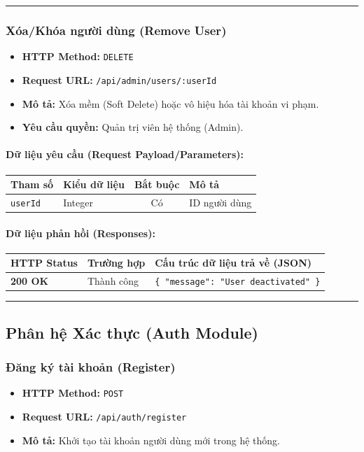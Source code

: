\documentclass[12pt,a4paper]{article}
\begin{document}
\vskip 0.4cm
\noindent\rule{\textwidth}{0.3pt}
\vskip 0.4cm

\subsubsection{Xóa/Khóa người dùng (Remove User)}
\begin{itemize}[leftmargin=*]
    \item \textbf{HTTP Method:} \texttt{DELETE}
    \item \textbf{Request URL:} \texttt{/api/admin/users/:userId}
    \item \textbf{Mô tả:} Xóa mềm (Soft Delete) hoặc vô hiệu hóa tài khoản vi phạm.
    \item \textbf{Yêu cầu quyền:} Quản trị viên hệ thống (Admin).
\end{itemize}

\paragraph{Dữ liệu yêu cầu (Request Payload/Parameters):}
\begin{longtable}{|p{2.8cm}|p{2.2cm}|c|p{7.0cm}|}
\hline
\textbf{Tham số} & \textbf{Kiểu dữ liệu} & \textbf{Bắt buộc} & \textbf{Mô tả} \\ \hline
\endhead
\texttt{userId} & Integer & Có & ID người dùng \\ \hline
\end{longtable}

\paragraph{Dữ liệu phản hồi (Responses):}
\begin{longtable}{|p{2.8cm}|p{3.2cm}|p{8.0cm}|}
\hline
\textbf{HTTP Status} & \textbf{Trường hợp} & \textbf{Cấu trúc dữ liệu trả về (JSON)} \\ \hline
\endhead
\textbf{200 OK} & Thành công & \texttt{\{ "message": "User deactivated" \}} \\ \hline
\end{longtable}

\vskip 0.4cm
\noindent\rule{\textwidth}{0.3pt}
\vskip 0.4cm

\subsection{Phân hệ Xác thực (Auth Module)}

\subsubsection{Đăng ký tài khoản (Register)}
\begin{itemize}[leftmargin=*]
    \item \textbf{HTTP Method:} \texttt{POST}
    \item \textbf{Request URL:} \texttt{/api/auth/register}
    \item \textbf{Mô tả:} Khởi tạo tài khoản người dùng mới trong hệ thống.
\end{itemize}
\end{document}

